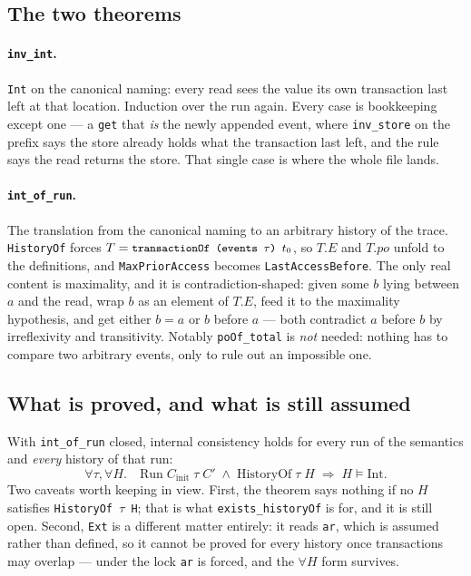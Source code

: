 \documentclass[11pt]{article}
\newcommand{\lean}[1]{\texttt{\small #1}}
\begin{document}
\subsection{The two theorems}

\paragraph{\lean{inv\_int}.}
\lean{Int} on the canonical naming: every read sees the value its own transaction
last left at that location. Induction over the run again. Every case is
bookkeeping except one --- a \lean{get} that \emph{is} the newly appended event,
where \lean{inv\_store} on the prefix says the store already holds what the
transaction last left, and the rule says the read returns the store. That single
case is where the whole file lands.

\paragraph{\lean{int\_of\_run}.}
The translation from the canonical naming to an arbitrary history of the trace.
\lean{HistoryOf} forces $T = \lean{transactionOf (events $\tau$) $t_0$}$, so $T.E$
and $T.po$ unfold to the definitions, and \lean{MaxPriorAccess} becomes
\lean{LastAccessBefore}. The only real content is maximality, and it is
contradiction-shaped: given some $b$ lying between $a$ and the read, wrap $b$ as
an element of $T.E$, feed it to the maximality hypothesis, and get either $b = a$
or $b$ before $a$ --- both contradict $a$ before $b$ by irreflexivity and
transitivity. Notably \lean{poOf\_total} is \emph{not} needed: nothing has to
compare two arbitrary events, only to rule out an impossible one.

\subsection{What is proved, and what is still assumed}

With \lean{int\_of\_run} closed, internal consistency holds for every run of the
semantics and \emph{every} history of that run:
\[
  \forall \tau, \forall H. \quad
  \mathrm{Run}\;C_{\mathrm{init}}\;\tau\;C' \;\wedge\; \mathrm{HistoryOf}\;\tau\;H
  \;\Longrightarrow\; H \models \mathrm{Int}.
\]
Two caveats worth keeping in view. First, the theorem says nothing if no $H$
satisfies \lean{HistoryOf $\tau$ H}; that is what \lean{exists\_historyOf} is for,
and it is still open. Second, \lean{Ext} is a different matter entirely: it reads
\lean{ar}, which is assumed rather than defined, so it cannot be proved for every
history once transactions may overlap --- under the lock \lean{ar} is forced, and
the $\forall H$ form survives.
\end{document}
